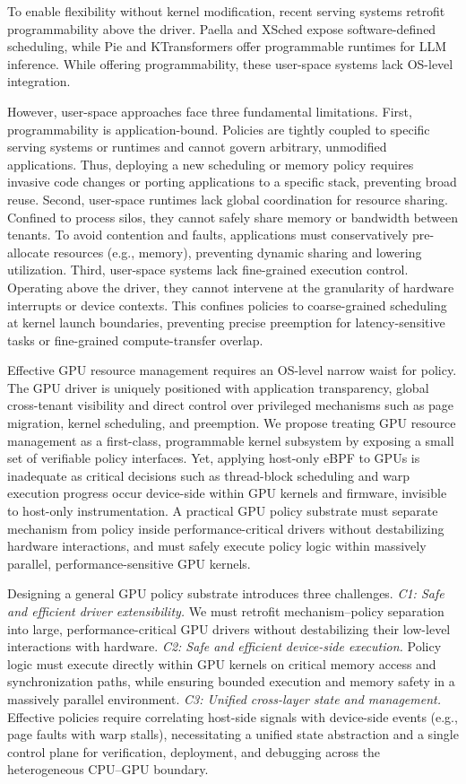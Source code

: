 To enable flexibility without kernel modification, recent serving systems retrofit programmability above the driver. Paella\cite{paella} and XSched\cite{xsched} expose software-defined scheduling, while Pie\cite{pie} and KTransformers\cite{ktransformers} offer programmable runtimes for LLM inference. While offering programmability, these user-space systems lack OS-level integration.

However, user-space approaches face three fundamental limitations. First, programmability is application-bound. Policies are tightly coupled to specific serving systems or runtimes and cannot govern arbitrary, unmodified applications. Thus, deploying a new scheduling or memory policy requires invasive code changes or porting applications to a specific stack, preventing broad reuse. Second, user-space runtimes lack global coordination for resource sharing. Confined to process silos, they cannot safely share memory or bandwidth between tenants. To avoid contention and faults, applications must conservatively pre-allocate resources (e.g., memory), preventing dynamic sharing and lowering utilization. Third, user-space systems lack fine-grained execution control. Operating above the driver, they cannot intervene at the granularity of hardware interrupts or device contexts. This confines policies to coarse-grained scheduling at kernel launch boundaries, preventing precise preemption for latency-sensitive tasks or fine-grained compute-transfer overlap.

Effective GPU resource management requires an OS-level narrow waist for policy. The GPU driver is uniquely positioned with application transparency, global cross-tenant visibility and direct control over privileged mechanisms such as page migration, kernel scheduling, and preemption. We propose treating GPU resource management as a first-class, programmable kernel subsystem by exposing a small set of verifiable policy interfaces.
Yet, applying host-only eBPF to GPUs is inadequate as critical decisions such as thread-block scheduling and warp execution progress occur device-side within GPU kernels and firmware, invisible to host-only instrumentation. A practical GPU policy substrate must separate mechanism from policy inside performance-critical drivers without destabilizing hardware interactions, and must safely execute policy logic within massively parallel, performance-sensitive GPU kernels.

Designing a general GPU policy substrate introduces three challenges. \emph{C1: Safe and efficient driver extensibility.} We must retrofit mechanism–policy separation into large, performance-critical GPU drivers without destabilizing their low-level interactions with hardware. \emph{C2: Safe and efficient device-side execution.} Policy logic must execute directly within GPU kernels on critical memory access and synchronization paths, while ensuring bounded execution and memory safety in a massively parallel environment. \emph{C3: Unified cross-layer state and management.} Effective policies require correlating host-side signals with device-side events (e.g., page faults with warp stalls), necessitating a unified state abstraction and a single control plane for verification, deployment, and debugging across the heterogeneous CPU–GPU boundary.

